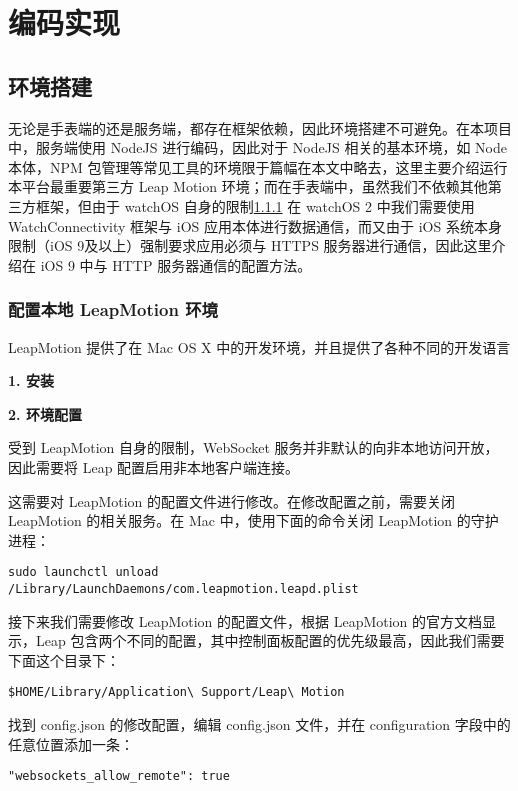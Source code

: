 \chapter{编码实现}

\section{环境搭建}

无论是手表端的还是服务端，都存在框架依赖，因此环境搭建不可避免。在本项目中，服务端使用 NodeJS 进行编码，因此对于 NodeJS 相关的基本环境，如 Node 本体，NPM 包管理等常见工具的环境限于篇幅在本文中略去，这里主要介绍运行本平台最重要第三方 Leap Motion 环境；而在手表端中，虽然我们不依赖其他第三方框架，但由于 watchOS 自身的限制\ref{} 在 watchOS 2 中我们需要使用 WatchConnectivity 框架与 iOS 应用本体进行数据通信，而又由于 iOS 系统本身限制（iOS 9及以上）强制要求应用必须与 HTTPS 服务器进行通信，因此这里介绍在 iOS 9 中与 HTTP 服务器通信的配置方法。

\subsection{配置本地 LeapMotion 环境}

LeapMotion 提供了在 Mac OS X 中的开发环境，并且提供了各种不同的开发语言

\textbf{1. 安装}



\textbf{2. 环境配置}

受到 LeapMotion 自身的限制\cite{Leap:2016}，WebSocket 服务并非默认的向非本地访问开放，因此需要将 Leap 配置启用非本地客户端连接。

这需要对 LeapMotion 的配置文件进行修改。在修改配置之前，需要关闭 LeapMotion 的相关服务。在 Mac 中，使用下面的命令关闭 LeapMotion 的守护进程：
\begin{lstlisting}
sudo launchctl unload /Library/LaunchDaemons/com.leapmotion.leapd.plist
\end{lstlisting}

接下来我们需要修改 LeapMotion 的配置文件，根据 LeapMotion 的官方文档显示，Leap 包含两个不同的配置，其中控制面板配置的优先级最高，因此我们需要下面这个目录下：
\begin{lstlisting}
$HOME/Library/Application\ Support/Leap\ Motion
\end{lstlisting}

找到 config.json 的修改配置，编辑 config.json 文件，并在 configuration 字段中的任意位置添加一条：
\begin{lstlisting}
"websockets_allow_remote": true
\end{lstlisting}

